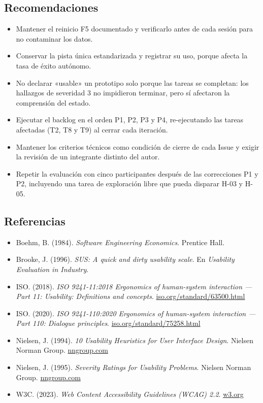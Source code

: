 \documentclass{article}
\begin{document}
\subsection{Recomendaciones}
\begin{itemize}[leftmargin=1.5em, itemsep=2pt]
    \item Mantener el reinicio F5 documentado y verificarlo antes de cada sesión para no contaminar los datos.
    \item Conservar la pista única estandarizada y registrar su uso, porque afecta la tasa de éxito autónomo.
    \item No declarar «usable» un prototipo solo porque las tareas se completan: los hallazgos de severidad 3 no impidieron terminar, pero sí afectaron la comprensión del estado.
    \item Ejecutar el backlog en el orden P1, P2, P3 y P4, re-ejecutando las tareas afectadas (T2, T8 y T9) al cerrar cada iteración.
    \item Mantener los criterios técnicos como condición de cierre de cada Issue y exigir la revisión de un integrante distinto del autor.
    \item Repetir la evaluación con cinco participantes después de las correcciones P1 y P2, incluyendo una tarea de exploración libre que pueda disparar H-03 y H-05.
\end{itemize}

\subsection{Referencias}
\begin{itemize}[leftmargin=1.5em, itemsep=2pt]
    \item Boehm, B. (1984). \textit{Software Engineering Economics}. Prentice Hall.
    \item Brooke, J. (1996). \textit{SUS: A quick and dirty usability scale}. En \textit{Usability Evaluation in Industry}.
    \item ISO. (2018). \textit{ISO 9241-11:2018 Ergonomics of human-system interaction --- Part 11: Usability: Definitions and concepts}. \href{https://www.iso.org/standard/63500.html}{iso.org/standard/63500.html}
    \item ISO. (2020). \textit{ISO 9241-110:2020 Ergonomics of human-system interaction --- Part 110: Dialogue principles}. \href{https://www.iso.org/standard/75258.html}{iso.org/standard/75258.html}
    \item Nielsen, J. (1994). \textit{10 Usability Heuristics for User Interface Design}. Nielsen Norman Group. \href{https://www.nngroup.com/articles/ten-usability-heuristics/}{nngroup.com}
    \item Nielsen, J. (1995). \textit{Severity Ratings for Usability Problems}. Nielsen Norman Group. \href{https://www.nngroup.com/articles/how-to-rate-the-severity-of-usability-problems/}{nngroup.com}
    \item W3C. (2023). \textit{Web Content Accessibility Guidelines (WCAG) 2.2}. \href{https://www.w3.org/TR/WCAG22/}{w3.org}
\end{itemize}
\end{document}
